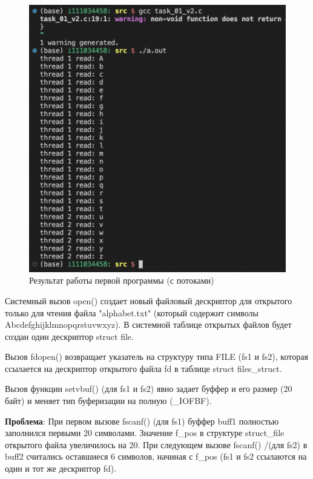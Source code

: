 \begin{figure}[H]
	\centering
	\includegraphics[scale=0.7]{inc/img/task_01_v2.png}
	\caption{Результат работы первой программы (с потоками)}
	\label{fig:prog_01_thread}
\end{figure}


Системный вызов open() создает новый файловый дескриптор для открытого только для чтения файла "alphabet.txt" (который содержит символы Abcdefghijklmnopqrstuvwxyz). В системной таблице открытых файлов будет создан один дескриптор struct file.

Вызов fdopen() возвращает указатель на структуру типа FILE (fs1 и fs2), которая ссылается на дескриптор открытого файла fd в таблице struct files\_struct. 
	
Вызов функции setvbuf() (для fs1 и fs2)  явно задает буффер и его размер (20 байт) и меняет тип буферизации на полную (\_IOFBF).

\textbf{Проблема}: При первом вызове fscanf()  (для fs1) буффер buff1 полностью заполнился первыми 20 символами. Значение f\_pos в структуре struct\_file открытого файла увеличилось на 20. При следующем вызове fscanf() /(для fs2) в buff2 считались оставшиеся 6 символов, начиная с f\_pos (fs1 и fs2 ссылаются на один и тот же дескриптор fd).

